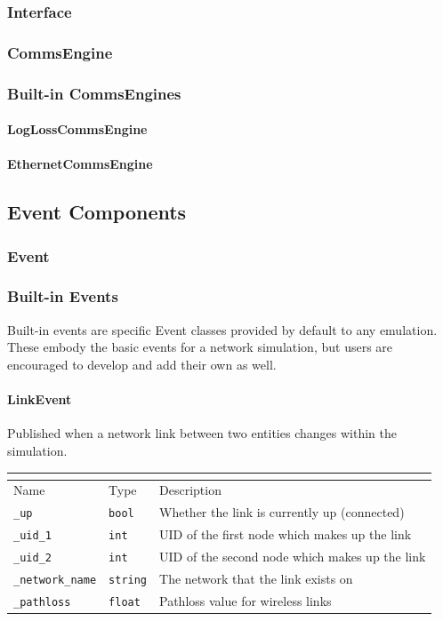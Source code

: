 \documentclass[titlepage]{article}
\newcommand{\attributes}[1]{
    \begin{center}
        \begin{tabular}{|p{3cm}|p{2cm}|p{7cm}|}
            \multicolumn{3}{|l|}{\cellcolor[gray]{0.5}{\textbf{Attributes}}} \\ \hline
            \rowcolor[gray]{0.8} Name & Type & Description \\ \hline 
            #1
        \end{tabular}
    \end{center}
}
\newcommand{\attribute}[3]{
    \texttt{#1} & \texttt{#2} & #3 \\ \hline
}
\begin{document}
\subsubsection{Interface}
\subsubsection{CommsEngine}

\subsubsection{Built-in CommsEngines}
\paragraph{LogLossCommsEngine}
\paragraph{EthernetCommsEngine}

\subsection{Event Components}
\subsubsection{Event}

\subsubsection{Built-in Events}
Built-in events are specific Event classes provided by default to any emulation. These embody the basic events for a network simulation, but users are encouraged to develop and add their own as well.
\paragraph{LinkEvent}{Published when a network link between two entities changes within the simulation.}

\attributes{
    \attribute{\_up}{bool}{Whether the link is currently up (connected)}
    \attribute{\_uid\_1}{int}{UID of the first node which makes up the link}
    \attribute{\_uid\_2}{int}{UID of the second node which makes up the link}
    \attribute{\_network\_name}{string}{The network that the link exists on}
    \attribute{\_pathloss}{float}{Pathloss value for wireless links}
}
\end{document}
